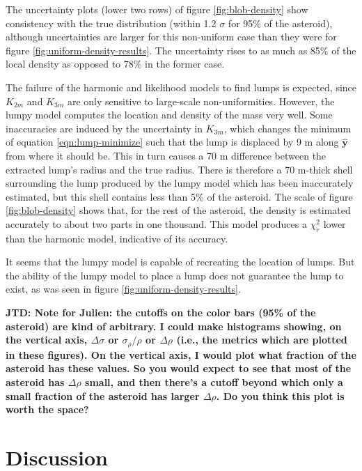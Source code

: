 \documentclass[fleqn,usenatbib]{mnras}
\newcommand{\jtd}[1]{ {\bf{\color{red} JTD: #1}} }
\newcommand{\unit}[1]{\bm{\hat{#1}}}
\begin{document}
The uncertainty plots (lower two rows) of figure \ref{fig:blob-density}  show consistency with the true distribution (within 1.2 $\sigma$ for 95\% of the asteroid), although uncertainties are larger for this non-uniform case than they were for figure \ref{fig:uniform-density-results}. The uncertainty rises to as much as 85\% of the local density as opposed to 78\% in the former case.

The failure of the harmonic and likelihood models to find lumps is expected, since $K_{2 m}$ and $K_{3 m}$ are only sensitive to large-scale non-uniformities. However, the lumpy model computes the location and density of the mass very well. Some inaccuracies are induced by the uncertainty in $K_{3m}$, which changes the minimum of equation \ref{eqn:lump-minimize} such that the lump is displaced by 9 m along $\unit y$ from where it should be. This in turn causes a 70 m difference between the extracted lump's radius and the true radius. There is therefore a 70 m-thick shell surrounding the lump produced by the lumpy model which has been inaccurately estimated, but this shell contains less than 5\% of the asteroid. The scale of figure \ref{fig:blob-density} shows that, for the rest of the asteroid, the density is estimated accurately to about two parts in one thousand. This model produces a $\chi^2_r$ lower than the harmonic model, indicative of its accuracy.

It seems that the lumpy model is capable of recreating the location of lumps. But the ability of the lumpy model to place a lump does not guarantee the lump to exist, as was seen in figure \ref{fig:uniform-density-results}.

\jtd{Note for Julien: the cutoffs on the color bars (95\% of the asteroid) are kind of arbitrary. I could make histograms showing, on the vertical axis, $\Delta \sigma$ or $\sigma_\rho/\rho$ or $\Delta \rho$ (i.e.,  the metrics which are plotted in these figures). On the vertical axis, I would plot what fraction of the asteroid has these values. So you would expect to see that most of the asteroid has $\Delta \rho$ small, and then there's a cutoff beyond which only a small fraction of the asteroid has larger $\Delta \rho$. Do you think this plot is worth the space?}


\section{Discussion}
\label{sec:discussion}

\end{document}
